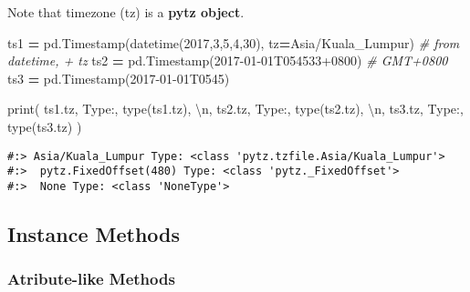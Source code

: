 \documentclass[
]{book}
\newenvironment{Shaded}{\begin{snugshade}}{\end{snugshade}}
\newcommand{\BuiltInTok}[1]{#1}
\newcommand{\CharTok}[1]{\textcolor[rgb]{0.5,0.5,0.5}{#1}}
\newcommand{\CommentTok}[1]{\textcolor[rgb]{0.37,0.37,0.37}{\textit{#1}}}
\newcommand{\DecValTok}[1]{\textcolor[rgb]{0.06,0.06,0.06}{#1}}
\newcommand{\NormalTok}[1]{#1}
\newcommand{\OperatorTok}[1]{\textcolor[rgb]{0.43,0.43,0.43}{\textbf{#1}}}
\newcommand{\StringTok}[1]{\textcolor[rgb]{0.5,0.5,0.5}{#1}}
\begin{document}
Note that timezone (tz) is a \textbf{pytz object}.

\begin{Shaded}
\begin{Highlighting}[]
\NormalTok{ts1 }\OperatorTok{=}\NormalTok{ pd.Timestamp(datetime(}\DecValTok{2017}\NormalTok{,}\DecValTok{3}\NormalTok{,}\DecValTok{5}\NormalTok{,}\DecValTok{4}\NormalTok{,}\DecValTok{30}\NormalTok{), tz}\OperatorTok{=}\StringTok{\textquotesingle{}Asia/Kuala\_Lumpur\textquotesingle{}}\NormalTok{)   }\CommentTok{\# from datetime, + tz}
\NormalTok{ts2 }\OperatorTok{=}\NormalTok{ pd.Timestamp(}\StringTok{\textquotesingle{}2017{-}01{-}01T054533+0800\textquotesingle{}}\NormalTok{) }\CommentTok{\# GMT+0800}
\NormalTok{ts3 }\OperatorTok{=}\NormalTok{ pd.Timestamp(}\StringTok{\textquotesingle{}2017{-}01{-}01T0545\textquotesingle{}}\NormalTok{)}

\BuiltInTok{print}\NormalTok{( ts1.tz, }\StringTok{\textquotesingle{}Type:\textquotesingle{}}\NormalTok{, }\BuiltInTok{type}\NormalTok{(ts1.tz), }\StringTok{\textquotesingle{}}\CharTok{\textbackslash{}n}\StringTok{\textquotesingle{}}\NormalTok{,}
\NormalTok{       ts2.tz, }\StringTok{\textquotesingle{}Type:\textquotesingle{}}\NormalTok{, }\BuiltInTok{type}\NormalTok{(ts2.tz), }\StringTok{\textquotesingle{}}\CharTok{\textbackslash{}n}\StringTok{\textquotesingle{}}\NormalTok{,}
\NormalTok{       ts3.tz, }\StringTok{\textquotesingle{}Type:\textquotesingle{}}\NormalTok{, }\BuiltInTok{type}\NormalTok{(ts3.tz)  )}
\end{Highlighting}
\end{Shaded}

\begin{verbatim}
#:> Asia/Kuala_Lumpur Type: <class 'pytz.tzfile.Asia/Kuala_Lumpur'> 
#:>  pytz.FixedOffset(480) Type: <class 'pytz._FixedOffset'> 
#:>  None Type: <class 'NoneType'>
\end{verbatim}

\hypertarget{instance-methods-1}{%
\subsection{Instance Methods}\label{instance-methods-1}}

\hypertarget{atribute-like-methods}{%
\subsubsection{Atribute-like Methods}\label{atribute-like-methods}}
\end{document}
